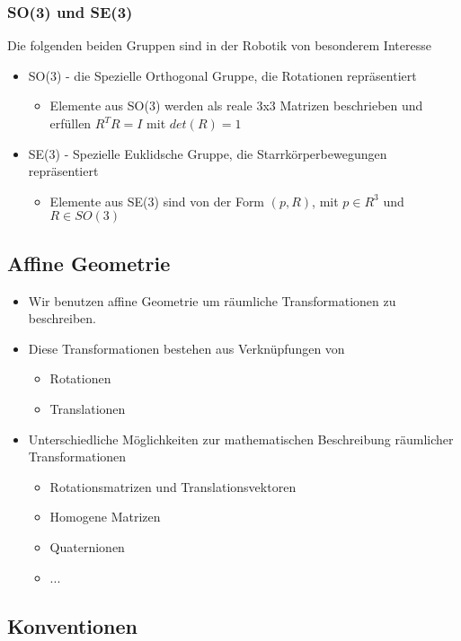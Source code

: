 \documentclass[paper=a4, fontsize=11pt]{scrartcl} %
\numberwithin{equation}{section} %
\numberwithin{figure}{section} %
\numberwithin{table}{section} %
\begin{document}
\subsubsection{SO(3) und SE(3)}

Die folgenden beiden Gruppen sind in der Robotik von besonderem Interesse

\begin{itemize}
\item SO(3) - die Spezielle Orthogonal Gruppe, die Rotationen repräsentiert
\begin{itemize}
\item Elemente aus SO(3) werden als reale 3x3 Matrizen beschrieben und erfüllen $R^T R = I$ mit $det(R) = 1$
\end{itemize}
\item SE(3) - Spezielle Euklidsche Gruppe, die Starrkörperbewegungen repräsentiert
\begin{itemize}
\item Elemente aus SE(3) sind von der Form $(p,R)$, mit $p \in R^3$ und $R \in SO(3)$
\end{itemize}
\end{itemize}

\subsection{Affine Geometrie}

\begin{itemize}
\item Wir benutzen affine Geometrie um räumliche Transformationen zu beschreiben.
\item Diese Transformationen bestehen aus Verknüpfungen von
\begin{itemize}
\item Rotationen
\item Translationen
\end{itemize}
\item Unterschiedliche Möglichkeiten zur mathematischen Beschreibung räumlicher Transformationen
\begin{itemize}
\item Rotationsmatrizen und Translationsvektoren
\item Homogene Matrizen
\item Quaternionen
\item ...
\end{itemize}
\end{itemize}

\subsection{Konventionen}
\end{document}
